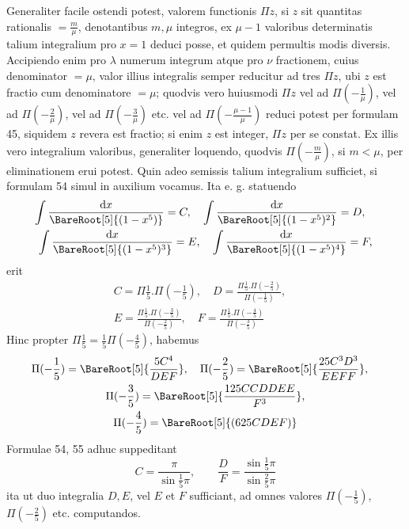 Generaliter facile ostendi potest, valorem functionis $\Pi z$, si $z$
sit quantitas rationalis $=\frac m\mu$, denotantibus $m,\mu$
integros, ex $\mu-1$ valoribus determinatis talium integralium pro
$x=1$ deduci posse, et quidem permultis modis diversis. Accipiendo
enim pro $\lambda$ numerum integrum atque pro $\nu$ fractionem,
cuius denominator $=\mu$, valor illius integralis semper reducitur
ad tres $\Pi z$, ubi $z$ est fractio cum denominatore $=\mu$;
quodvis vero huiusmodi $\Pi z$ vel ad $\Pi(-\frac1\mu)$,
vel ad $\Pi(-\frac2\mu)$, vel ad $\Pi(-\frac3\mu)$ etc.
vel ad $\Pi(-\frac{\mu-1}{\mu})$ reduci potest per formulam 45,
siquidem $z$ revera est fractio; si enim $z$ est integer, $\Pi z$
per se constat. Ex illis vero integralium valoribus, generaliter
loquendo, quodvis $\Pi(-\frac m\mu)$,
si $m<\mu$, per eliminationem erui potest.
Quin adeo semissis talium integralium sufficiet, si formulam 54
simul in auxilium vocamus. Ita e. g. statuendo
\[
\begin{gathered}
\int\frac{\mathrm{d}x}{\BareRoot[5]{(1-x^5)}}=C,\quad
\int\frac{\mathrm{d}x}{\BareRoot[5]{(1-x^5)^2}}=D,\quad
\\\int\frac{\mathrm{d}x}{\BareRoot[5]{(1-x^5)^3}}=E,\quad
\int\frac{\mathrm{d}x}{\BareRoot[5]{(1-x^5)^4}}=F,
\end{gathered}
\]
erit
\[
\begin{gathered}
C=\Pi\frac15.\Pi(-\frac15),\quad
D=\frac{\Pi\frac15.\Pi(-\frac25)}{\Pi(-\frac15)},\quad
\\E=\frac{\Pi\frac15.\Pi(-\frac35)}{\Pi(-\frac25)},\quad
F=\frac{\Pi\frac15.\Pi(-\frac45)}{\Pi(-\frac35)}
\end{gathered}
\]
Hinc propter $\Pi\frac15=\frac15\Pi(-\frac45)$, habemus
\[
\begin{gathered}
\Pi(-\frac15)=\BareRoot[5]{\frac{5C^4}{DEF}},\quad
\Pi(-\frac25)=\BareRoot[5]{\frac{25C^3D^3}{EEFF}},\quad
\\\Pi(-\frac35)=\BareRoot[5]{\frac{125CCDDEE}{F^3}},\\
\Pi(-\frac45)=\BareRoot[5]{(625CDEF)}
\end{gathered}
\]
Formulae 54, 55 adhuc suppeditant
\[
C=\frac\pi{\sin\frac15\pi},\qquad
\frac DF=\frac{\sin\frac15\pi}{\sin\frac25\pi}
\]
ita ut duo integralia $D,E$, vel $E$ et $F$ sufficiant, ad omnes
valores $\Pi(-\frac15)$, $\Pi(-\frac25)$ etc. computandos.

